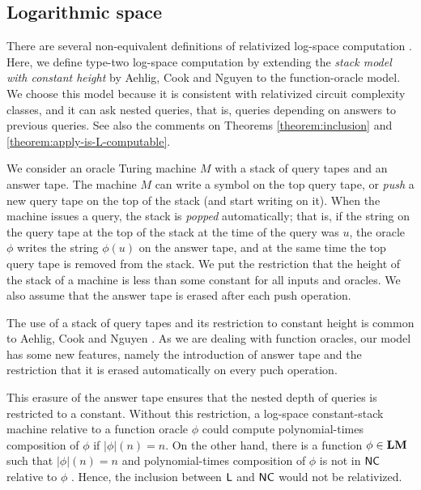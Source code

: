 \documentclass[envcountsame,orivec,oribibl]{llncs}
\begin{document}
\subsection{Logarithmic space}
There are several non-equivalent definitions of 
relativized log-space computation
\cite{aehlig2007relativizing,buss1988relativized,ladner1976relativization,wilson1988measure}.
Here, we define type-two log-space computation 
by extending the {\em stack model with constant height} 
by Aehlig, Cook and Nguyen \cite{aehlig2007relativizing} to the 
function-oracle model.
We choose this model because it is consistent with relativized circuit complexity classes, 
and it can ask nested queries, that is, queries depending on answers to previous queries.
See also the comments on Theorems \ref{theorem:inclusion} and \ref{theorem:apply-is-L-computable}.

We consider an oracle Turing machine $M$ 
with a stack of query tapes and an answer tape.
The machine $M$ can write a symbol on the top query tape, or 
\emph{push} a new query tape on the top of the stack (and start writing on it).
When the machine issues a query, the stack is \emph{popped} automatically; 
that is, 
if the string on the query tape at the top of the stack at the time of the query was $u$, 
the oracle $\phi$ writes the string $\phi (u)$ on the answer tape, 
and at the same time the top query tape is removed from the stack. 
We put the restriction that the height of the stack of a machine is less than 
some constant for all inputs and oracles.
We also assume that 
the answer tape is erased after each push operation.

The use of a stack of query tapes and its restriction to constant height 
is common to Aehlig, Cook and Nguyen \cite{aehlig2007relativizing}. 
As we are dealing with function oracles, 
our model has some new features, namely 
the introduction of answer tape and 
the restriction that it is erased automatically on every puch operation. 

This erasure of the answer tape
ensures that the nested depth of queries is restricted to a constant.
Without this restriction, a log-space constant-stack machine relative to 
a function oracle $\phi$ could compute polynomial-times composition
of $\phi$ if $|\phi|(n) = n$.
On the other hand, there is a function $\phi \in \mathbf{LM}$ such that $|\phi|(n) = n$
and polynomial-times composition of $\phi$ is not in $\mathsf{NC}$ relative to $\phi$ \cite{aehlig2007relativizing}.
Hence, the inclusion between $\mathsf{L}$ and $\mathsf{NC}$ would not be relativized.
\end{document}
